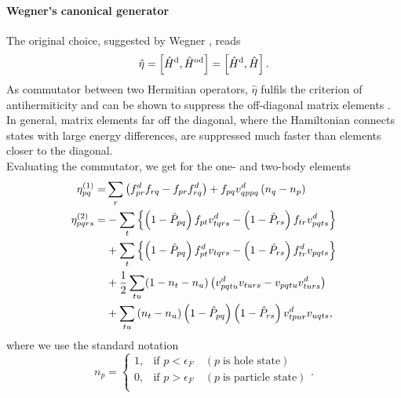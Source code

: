 \documentclass[amsmath, amssymb, aps, floatfix, nofootinbib, preprintnumbers,showpacs, superscriptaddress, twocolumn]{revtex4-1}
\newcommand{\lb}{\left(}
\newcommand{\rb}{\right)}
\newcommand{\Hd}{\hat{H}^{\rm d}}
\newcommand{\Ho}{\hat{H}^{\rm od}}
\newcommand{\be}{\begin{equation}}
\newcommand{\ee}{\end{equation}}
\newcommand{\llb}{\lbrace}
\newcommand{\rrb}{\rbrace}
\begin{document}
\paragraph*{Wegner's canonical generator}
The original choice, suggested by Wegner \cite{PhysRepWegner0}, reads
\be \hat{\eta} = \left[ \Hd, \Ho \right] = \left[ \Hd, \hat{H}
  \right].
\label{eq:etaWegner}
\ee As commutator between two Hermitian operators, $\hat{\eta}$
fulfils the criterion of antihermiticity and can be shown to suppress
the off-diagonal matrix elements \cite{kehrein2006flow}. In general,
matrix elements far off the diagonal, where the Hamiltonian connects
states with large energy differences, are suppressed much faster than
elements closer to the diagonal. \\ Evaluating the commutator, we get
for the one- and two-body elements
\begin{align*}
\eta_{pq}^{(1)} = & \sum_{r}\lb f_{pr}^d f_{rq} - f_{pr} f_{rq}^d \rb
+ f_{pq} v_{qppq}^d \lb n_q - n_p \rb \\ \eta_{pqrs}^{(2)} = & -
\sum_t \left\lbrace \lb 1-\hat{P}_{pq} \rb f_{pt} v_{tqrs}^d - \lb 1 -
\hat{P}_{rs} \rb f_{tr} v_{pqts}^d \right\rbrace \notag \\ & + \sum_t
\left\llb \lb 1 - \hat{P}_{pq} \rb f_{pt}^d v_{tqrs} - \lb 1 -
\hat{P}_{rs} \rb f_{tr}^d v_{pqts} \right\rrb \notag \\ & +
\frac{1}{2} \sum_{tu} (1 - n_t - n_u) \lb v_{pqtu}^d v_{turs} -
v_{pqtu} v_{turs}^d \rb \notag \\ & + \sum_{tu} \lb n_t - n_u \rb \lb
1 - \hat{P}_{pq} \rb \lb 1 - \hat{P}_{rs} \rb v_{tpur}^d v_{uqts},
\end{align*}
where we use the standard notation
\[
n_p = \begin{cases} 1, & \mbox{if } p< \epsilon_F \quad(p\;\mbox{is
    hole state})\\ 0, &\mbox{if } p> \epsilon_F \quad(p\;\mbox{is
    particle state})\\
\end{cases}.
\]
\end{document}
